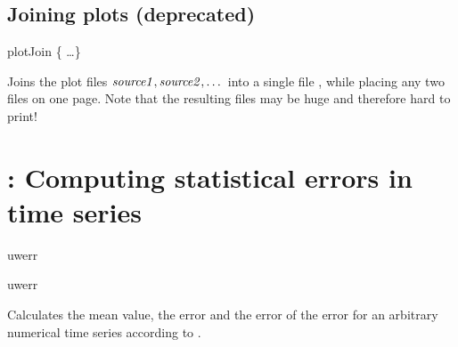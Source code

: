 \subsection{Joining plots (deprecated)}
\begin{essyntax}
  plotJoin \{   \dots \} 
\end{essyntax}
Joins the plot files $\var{source1}, \var{source2}, \dots$ into a
single file , while placing any two files on one page.
Note that the resulting files may be huge and therefore hard to print!


\section{: Computing statistical errors in time series}
\label{sec:uwerr}

\begin{essyntax}
   uwerr   
    

   uwerr   
    
\end{essyntax}
Calculates the mean value, the error and the error of the error for an
arbitrary numerical time series according to \citet{wolff04a}.

